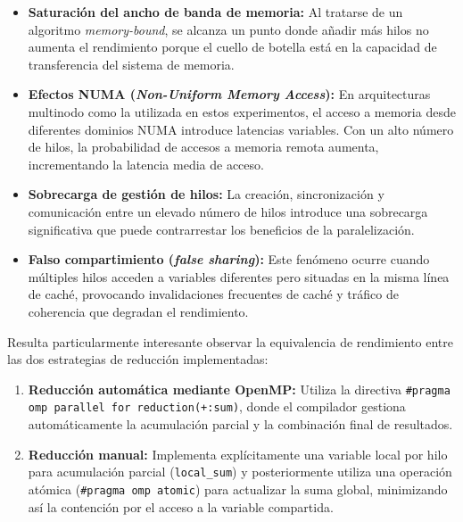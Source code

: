 \begin{enumerate}
\begin{itemize}
                    \item \textbf{Saturación del ancho de banda de memoria:} Al tratarse de un algoritmo \textit{memory-bound}, se alcanza un punto donde añadir más hilos no aumenta el rendimiento porque el cuello de botella está en la capacidad de transferencia del sistema de memoria.
                    
                    \item \textbf{Efectos NUMA (\textit{Non-Uniform Memory Access}):} En arquitecturas multinodo como la utilizada en estos experimentos, el acceso a memoria desde diferentes dominios NUMA introduce latencias variables. Con un alto número de hilos, la probabilidad de accesos a memoria remota aumenta, incrementando la latencia media de acceso.
                    
                    \item \textbf{Sobrecarga de gestión de hilos:} La creación, sincronización y comunicación entre un elevado número de hilos introduce una sobrecarga significativa que puede contrarrestar los beneficios de la paralelización.
                    
                    \item \textbf{Falso compartimiento (\textit{false sharing}):} Este fenómeno ocurre cuando múltiples hilos acceden a variables diferentes pero situadas en la misma línea de caché, provocando invalidaciones frecuentes de caché y tráfico de coherencia que degradan el rendimiento.
                    
                \end{itemize}

        \end{enumerate}

        Resulta particularmente interesante observar la equivalencia de rendimiento entre las dos estrategias de reducción implementadas:
        
        \begin{enumerate}
        
            \item \textbf{Reducción automática mediante OpenMP:} Utiliza la directiva \texttt{\#pragma omp parallel for reduction(+:sum)}, donde el compilador gestiona automáticamente la acumulación parcial y la combinación final de resultados.
            
            \item \textbf{Reducción manual:} Implementa explícitamente una variable local por hilo para acumulación parcial (\texttt{local\_sum}) y posteriormente utiliza una operación atómica (\texttt{\#pragma omp atomic}) para actualizar la suma global, minimizando así la contención por el acceso a la variable compartida.
            
        \end{enumerate}
        
